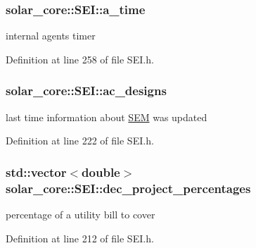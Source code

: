 \subsubsection[{a\+\_\+time}]{ solar\+\_\+core\+::\+S\+E\+I\+::a\+\_\+time\hspace{0.3cm}{\ttfamily [protected]}}\label{classsolar__core_1_1_s_e_i_abf17b36abf722993d5ad53710579d402}
internal agent\textquotesingle{}s timer 

Definition at line 258 of file S\+E\+I.\+h.

\hypertarget{classsolar__core_1_1_s_e_i_a147ec60ca551d9195cdf5937eda5f903}{}
\subsubsection[{ac\+\_\+designs}]{ solar\+\_\+core\+::\+S\+E\+I\+::ac\+\_\+designs\hspace{0.3cm}{\ttfamily [protected]}}\label{classsolar__core_1_1_s_e_i_a147ec60ca551d9195cdf5937eda5f903}
last time information about \hyperlink{classsolar__core_1_1_s_e_m}{S\+E\+M} was updated 

Definition at line 222 of file S\+E\+I.\+h.

\hypertarget{classsolar__core_1_1_s_e_i_a272838ea17b8cd4e49c9a8c53facfd8f}{}
\subsubsection[{dec\+\_\+project\+\_\+percentages}]{\setlength{\rightskip}{0pt plus 5cm}std\+::vector$<$double$>$ solar\+\_\+core\+::\+S\+E\+I\+::dec\+\_\+project\+\_\+percentages\hspace{0.3cm}{\ttfamily [protected]}}\label{classsolar__core_1_1_s_e_i_a272838ea17b8cd4e49c9a8c53facfd8f}
percentage of a utility bill to cover 

Definition at line 212 of file S\+E\+I.\+h.

\hypertarget{classsolar__core_1_1_s_e_i_a79728143af5752e09c2be29cfa1cfd8f}{}
